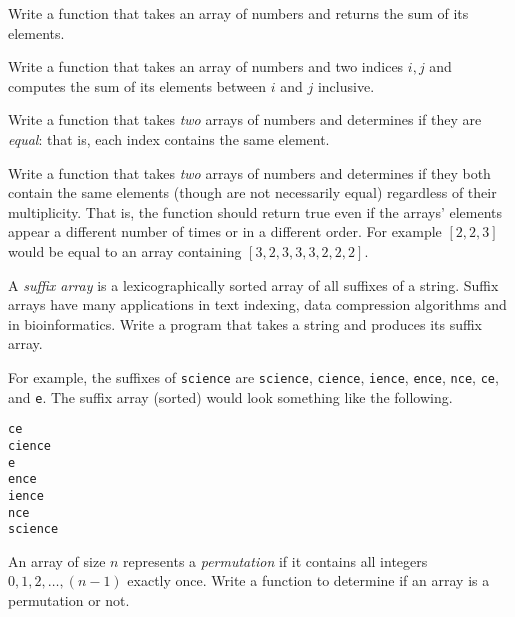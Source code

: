 \begin{exer}
Write a function that takes an array of numbers and returns the
sum of its elements.
\end{exer}

\begin{exer}
Write a function that takes an array of numbers and two indices
$i, j$ and computes the sum of its elements between $i$ and
$j$ inclusive.  
\end{exer}

\begin{exer}
Write a function that takes \emph{two} arrays of numbers and
determines if they are \emph{equal}: that is, each index contains 
the same element.
\end{exer}

\begin{exer}
Write a function that takes \emph{two} arrays of numbers and
determines if they both contain the same elements (though 
are not necessarily equal) regardless of their multiplicity.  That is, 
the function should return true even if the arrays' elements 
appear a different number of times or in a different order.
For example $[2, 2, 3]$ would be equal to an array containing 
$[3, 2, 3, 3, 3, 2, 2, 2]$.
\end{exer}

\begin{exer}
A \emph{suffix array} is a lexicographically sorted array of 
all suffixes of a string.  Suffix arrays have many applications 
in text indexing, data compression algorithms and in 
bioinformatics.  Write a program that takes a string 
and produces its suffix array.  

For example, the suffixes of \texttt{science} are
\texttt{science}, \texttt{cience}, \texttt{ience}, \texttt{ence}, \texttt{nce}, \texttt{ce}, and \texttt{e}. The suffix array (sorted) would look something 
like the following.

\begin{verbatim}
ce
cience
e
ence
ience
nce 
science
\end{verbatim}
\end{exer}

\begin{exer} 
An array of size $n$ represents a \emph{permutation} if it 
contains all integers $0, 1, 2, \ldots, (n-1)$ exactly once.  
Write a function to determine if an array is a permutation or 
not.
\end{exer}

